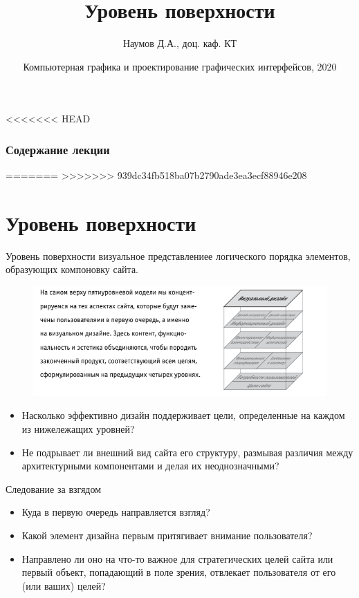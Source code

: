 \documentclass{beamer}
\title[Уровень поверхности]{Уровень поверхности}
\author{Наумов Д.А., доц. каф. КТ}
\date[21.10.2020] {Компьютерная графика и проектирование графических интерфейсов, 2020}
\begin{document}
\begin{frame}
  \titlepage
\end{frame}
  
<<<<<<< HEAD
\begin{frame}
  \frametitle{Содержание лекции}
  \tableofcontents  
\end{frame}
=======
>>>>>>> 939dc34fb518ba07b2790ade3ea3ecf88946e208

\section{Уровень поверхности}
  
\begin{frame}[t]
	\begin{block}{Уровень поверхности}
		визуальное представлениее логического порядка элементов, образующих компоновку сайта. 
	\end{block}
	\begin{figure}[h]
		\centering
		\includegraphics[scale=0.5]{images/lec05-pic01.png}
	\end{figure}
	\begin{itemize}
		\item Насколько эффективно дизайн поддерживает цели, определенные на каждом из нижележащих уровней? 
		\item Не подрывает ли внешний вид сайта его структуру, размывая различия между архитектурными компонентами и делая их неоднозначными?
	\end{itemize}
\end{frame} 

\begin{frame}[t]{Следование за взгядом}
	\begin{itemize}
		\item Куда в первую очередь направляется взгляд? 
		\item Какой элемент дизайна первым притягивает внимание пользователя? 
		\item Направлено ли оно на что-то важное для стратегических целей сайта или первый объект, попадающий в поле зрения, отвлекает пользователя от его (или ваших) целей?
	\end{itemize}
\end{frame}
\end{document}
